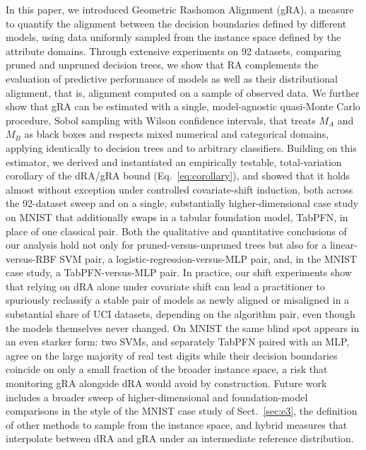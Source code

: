 \documentclass[runningheads]{llncs}
\begin{document}
In this paper, we introduced Geometric Rashomon Alignment (gRA), a measure to quantify the alignment between the decision boundaries defined by different models, using data uniformly sampled from the instance space defined by the attribute domains. Through extensive experiments on 92 datasets, comparing pruned and unpruned decision trees, we show that RA complements the evaluation of predictive performance of models as well as their distributional alignment, that is, alignment computed on a sample of observed data. We further show that gRA can be estimated with a single, model-agnostic quasi-Monte Carlo procedure, Sobol sampling with Wilson confidence intervals, that treats $M_A$ and $M_B$ as black boxes and respects mixed numerical and categorical domains, applying identically to decision trees and to arbitrary classifiers. Building on this estimator, we derived and instantiated an empirically testable, total-variation corollary of the dRA/gRA bound (Eq.~\eqref{eq:corollary}), and showed that it holds almost without exception under controlled covariate-shift induction, both across the 92-dataset sweep and on a single, substantially higher-dimensional case study on MNIST that additionally swaps in a tabular foundation model, TabPFN, in place of one classical pair. Both the qualitative and quantitative conclusions of our analysis hold not only for pruned-versus-unpruned trees but also for a linear-versus-RBF SVM pair, a logistic-regression-versus-MLP pair, and, in the MNIST case study, a TabPFN-versus-MLP pair. In practice, our shift experiments show that relying on dRA alone under covariate shift can lead a practitioner to spuriously reclassify a stable pair of models as newly aligned or misaligned in a substantial share of UCI datasets, depending on the algorithm pair, even though the models themselves never changed. On MNIST the same blind spot appears in an even starker form: two SVMs, and separately TabPFN paired with an MLP, agree on the large majority of real test digits while their decision boundaries coincide on only a small fraction of the broader instance space, a risk that monitoring gRA alongside dRA would avoid by construction.
Future work includes a broader sweep of higher-dimensional and foundation-model comparisons in the style of the MNIST case study of Sect.~\ref{sec:e3}, the definition of other methods to sample from the instance space, and hybrid measures that interpolate between dRA and gRA under an intermediate reference distribution.


\end{document}
